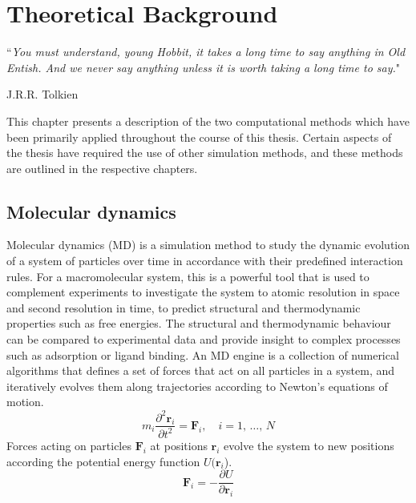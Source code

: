 \chapter{Theoretical Background}
\label{Introduction}
%
\epigraph{``\textit{You must understand, young Hobbit, it takes a long time to say anything in Old Entish. And we never say anything unless it is worth taking a long time to say.}"}{J.R.R. Tolkien}
%
This chapter presents a description of the two computational methods which have been primarily applied throughout the course of this thesis. Certain aspects of the thesis have required the use of other simulation methods, and these methods are outlined in the respective chapters.

\section{Molecular dynamics}\label{chapter:MD}
%
Molecular dynamics (MD) is a simulation method to study the dynamic evolution of a system of particles over time in accordance with their predefined interaction rules. For a macromolecular system, this is a powerful tool that is used to complement experiments to investigate the system to atomic resolution in space and second resolution in time, to predict structural and thermodynamic properties such as free energies.\cite{mcquarrie1965statistical} The structural and thermodynamic behaviour can be compared to experimental data and provide insight to complex processes such as adsorption or ligand binding. An MD engine is a collection of numerical algorithms that defines a set of forces that act on all particles in a system, and iteratively evolves them along trajectories according to Newton's equations of motion.
%
\begin{equation} \label{eq:newtons2nd}
m_i \frac{\partial^2\mathbf{r}_i}{\partial t^2}=\mathbf{F}_i,\quad  i = 1,\,\dots,\,N
\end{equation}
%
Forces acting on particles $\mathbf{F}_i$ at positions $\mathbf{r}_i$ evolve the system to new positions according  the potential energy function $U(\mathbf{r}_i$).
%
\begin{equation} \label{eq:newton}
\mathbf{F}_i = -\frac{\partial U}{\partial \mathbf{r}_i}
\end{equation}
%
